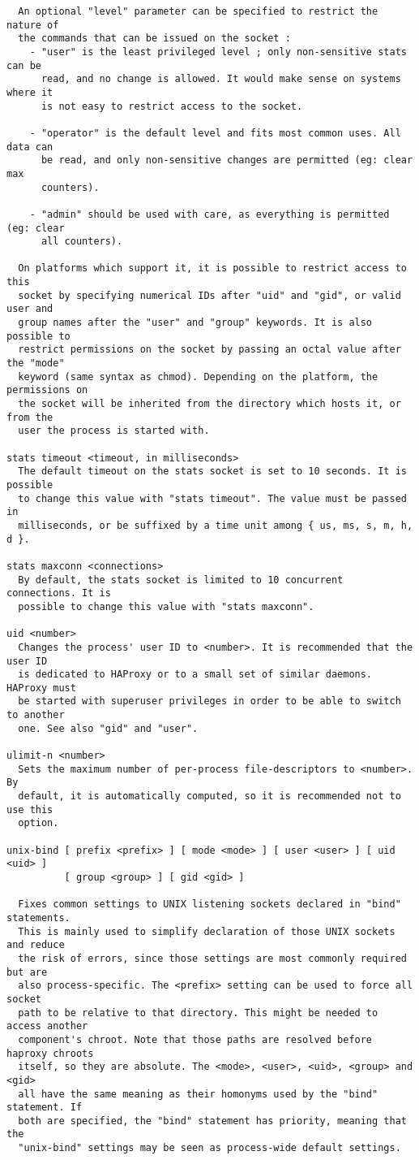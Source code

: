 \begin{verbatim}
  An optional "level" parameter can be specified to restrict the nature of
  the commands that can be issued on the socket :
    - "user" is the least privileged level ; only non-sensitive stats can be
      read, and no change is allowed. It would make sense on systems where it
      is not easy to restrict access to the socket.

    - "operator" is the default level and fits most common uses. All data can
      be read, and only non-sensitive changes are permitted (eg: clear max
      counters).

    - "admin" should be used with care, as everything is permitted (eg: clear
      all counters).

  On platforms which support it, it is possible to restrict access to this
  socket by specifying numerical IDs after "uid" and "gid", or valid user and
  group names after the "user" and "group" keywords. It is also possible to
  restrict permissions on the socket by passing an octal value after the "mode"
  keyword (same syntax as chmod). Depending on the platform, the permissions on
  the socket will be inherited from the directory which hosts it, or from the
  user the process is started with.

stats timeout <timeout, in milliseconds>
  The default timeout on the stats socket is set to 10 seconds. It is possible
  to change this value with "stats timeout". The value must be passed in
  milliseconds, or be suffixed by a time unit among { us, ms, s, m, h, d }.

stats maxconn <connections>
  By default, the stats socket is limited to 10 concurrent connections. It is
  possible to change this value with "stats maxconn".

uid <number>
  Changes the process' user ID to <number>. It is recommended that the user ID
  is dedicated to HAProxy or to a small set of similar daemons. HAProxy must
  be started with superuser privileges in order to be able to switch to another
  one. See also "gid" and "user".

ulimit-n <number>
  Sets the maximum number of per-process file-descriptors to <number>. By
  default, it is automatically computed, so it is recommended not to use this
  option.

unix-bind [ prefix <prefix> ] [ mode <mode> ] [ user <user> ] [ uid <uid> ]
          [ group <group> ] [ gid <gid> ]

  Fixes common settings to UNIX listening sockets declared in "bind" statements.
  This is mainly used to simplify declaration of those UNIX sockets and reduce
  the risk of errors, since those settings are most commonly required but are
  also process-specific. The <prefix> setting can be used to force all socket
  path to be relative to that directory. This might be needed to access another
  component's chroot. Note that those paths are resolved before haproxy chroots
  itself, so they are absolute. The <mode>, <user>, <uid>, <group> and <gid>
  all have the same meaning as their homonyms used by the "bind" statement. If
  both are specified, the "bind" statement has priority, meaning that the
  "unix-bind" settings may be seen as process-wide default settings.


\end{verbatim}
